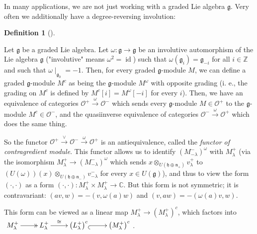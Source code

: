 \documentclass
[numbers=enddot,12pt,final,onecolumn,german,notitlepage]{scrartcl}%
\makeatletter
\newcommand{\arinj}{\ar@{_{(}->}}
\newcommand{\arsurj}{\ar@{->>}}
\theoremstyle{definition}
\newtheorem{defi}[theo]{Definition}
\newenvironment{definition}[1][]
{\begin{defi}[#1]\begin{leftbar}}
{\end{leftbar}\end{defi}}
\makeatother
\begin{document}
In many applications, we are not just working with a graded Lie algebra
$\mathfrak{g}$. Very often we additionally have a degree-reversing involution:

\begin{definition}
\label{def.invol}Let $\mathfrak{g}$ be a graded Lie algebra. Let
$\omega:\mathfrak{g}\rightarrow\mathfrak{g}$ be an involutive automorphism of
the Lie algebra $\mathfrak{g}$ ("involutive" means $\omega^{2}%
=\operatorname*{id}$) such that $\omega\left(  \mathfrak{g}_{i}\right)
=\mathfrak{g}_{-i}$ for all $i\in\mathbb{Z}$ and such that $\omega
\mid_{\mathfrak{g}_{0}}=-1$. Then, for every graded $\mathfrak{g}$-module $M$,
we can define a graded $\mathfrak{g}$-module $M^{c}$ as being the
$\mathfrak{g}$-module $M^{\omega}$ with opposite grading (i. e., the grading
on $M^{c}$ is defined by $M^{c}\left[  i\right]  =M^{\omega}\left[  -i\right]
$ for every $i$). Then, we have an equivalence of categories $\mathcal{O}%
^{+}\overset{\omega}{\rightarrow}\mathcal{O}^{-}$ which sends every
$\mathfrak{g}$-module $M\in\mathcal{O}^{+}$ to the $\mathfrak{g}$-module
$M^{c}\in\mathcal{O}^{-}$, and the quasiinverse equivalence of categories
$\mathcal{O}^{-}\overset{\omega}{\rightarrow}\mathcal{O}^{+}$ which does the
same thing.

So the functor $\mathcal{O}^{+}\overset{\vee}{\rightarrow}\mathcal{O}%
^{-}\overset{\omega}{\rightarrow}\mathcal{O}^{+}$ is an antiequivalence,
called the \textit{functor of contragredient module}. This functor allows us
to identify $\left(  M_{-\lambda}^{-}\right)  ^{\omega}$ with $M_{\lambda}%
^{+}$ (via the isomorphism $M_{\lambda}^{+}\rightarrow\left(  M_{-\lambda}%
^{-}\right)  ^{\omega}$ which sends $x\otimes_{U\left(  \mathfrak{h}%
\oplus\mathfrak{n}_{+}\right)  }v_{\lambda}^{+}$ to $\left(  U\left(
\omega\right)  \right)  \left(  x\right)  \otimes_{U\left(  \mathfrak{h}%
\oplus\mathfrak{n}_{-}\right)  }v_{-\lambda}^{-}$ for every $x\in U\left(
\mathfrak{g}\right)  $), and thus to view the form $\left(  \cdot
,\cdot\right)  $ as a form $\left(  \cdot,\cdot\right)  :M_{\lambda}^{+}\times
M_{\lambda}^{+}\rightarrow\mathbb{C}$. But this form is not symmetric; it is
contravariant: $\left(  av,w\right)  =-\left(  v,\omega\left(  a\right)
w\right)  $ and $\left(  v,aw\right)  =-\left(  \omega\left(  a\right)
v,w\right)  $.

This form can be viewed as a linear map $M_{\lambda}^{+}\rightarrow\left(
M_{\lambda}^{+}\right)  ^{c}$, which factors into $%
\xymatrix{
M^{+}_{\lambda} \arsurj[r] & L^{+}_{\lambda} \ar[r]^-{\cong}
& \left(L^{+}_{\lambda}\right)^{c} \arinj[r] & \left(M^{+}_{\lambda}%
\right)^{c}
}%
$.
\end{definition}
\end{document}
